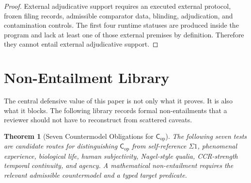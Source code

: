 \documentclass[11pt,a4paper]{article}
\newtheorem{theorem}{Theorem}[section]
\theoremstyle{definition}
\newcommand{\Cop}{\mathsf{C}_{\mathrm{op}}}
\begin{document}
\begin{proof}
External adjudicative support requires an executed external protocol, frozen filing
records, admissible comparator data, blinding, adjudication, and contamination
controls. The first four runtime statuses are produced inside the program and
lack at least one of those external premises by definition. Therefore they
cannot entail external adjudicative support.
\end{proof}

\section{Non-Entailment Library}

The central defensive value of this paper is not only what it proves. It is also
what it blocks. The following library records formal non-entailments that a
reviewer should not have to reconstruct from scattered caveats.

\begin{theorem}[Seven Countermodel Obligations for $\Cop$]\label{thm:nonentailment-library}
The following seven tests are candidate routes for distinguishing $\Cop$ from self-reference $\Sigma1$, phenomenal experience, biological life, human subjectivity, Nagel-style qualia, CCR-strength temporal continuity, and agency. A mathematical non-entailment requires the relevant admissible countermodel and a typed target predicate.
\end{theorem}
\end{document}
